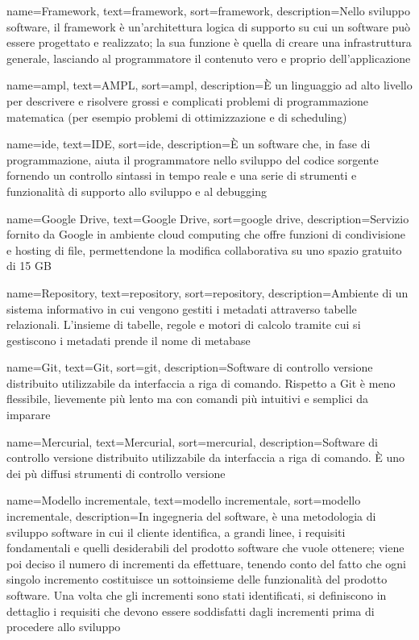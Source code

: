 {
    name=Framework,
    text=framework,
    sort=framework,
    description={Nello sviluppo software, il framework è un'architettura logica di supporto su cui un software può essere progettato e realizzato; la sua funzione è quella di creare una infrastruttura generale, lasciando al programmatore il contenuto vero e proprio dell'applicazione}
}

{
    name=\gls{ampl},
    text=AMPL,
    sort=ampl,
    description={È un linguaggio ad alto livello per descrivere e risolvere grossi e complicati problemi di programmazione matematica (per esempio problemi di ottimizzazione e di scheduling)}
}

{
    name=\gls{ide},
    text=IDE,
    sort=ide,
    description={È un software che, in fase di programmazione, aiuta il programmatore nello sviluppo del codice sorgente fornendo un controllo sintassi in tempo reale e una serie di strumenti e funzionalità di supporto allo sviluppo e al debugging}
}

{
    name=Google Drive,
    text=Google Drive,
    sort=google drive,
    description={Servizio fornito da Google in ambiente cloud computing che offre funzioni di condivisione e hosting di file, permettendone la modifica collaborativa su uno spazio gratuito di 15 GB}
}

{
    name=Repository,
    text=repository,
    sort=repository,
    description={Ambiente di un sistema informativo in cui vengono gestiti i metadati attraverso tabelle relazionali. L'insieme di tabelle, regole e motori di calcolo tramite cui si gestiscono i metadati prende il nome di metabase}
}

{
    name=Git,
    text=Git,
    sort=git,
    description={Software di controllo versione distribuito utilizzabile da interfaccia a riga di comando. Rispetto a Git è meno flessibile, lievemente più lento ma con comandi più intuitivi e semplici da imparare}
}

{
    name=Mercurial,
    text=Mercurial,
    sort=mercurial,
    description={Software di controllo versione distribuito utilizzabile da interfaccia a riga di comando. È uno dei pù diffusi strumenti di controllo versione}
}

{
    name=Modello incrementale,
    text=modello incrementale,
    sort=modello incrementale,
    description={In ingegneria del software, è una metodologia di sviluppo software in cui il cliente identifica, a grandi linee, i requisiti fondamentali e quelli desiderabili del prodotto software che vuole ottenere; viene poi deciso il numero di incrementi da effettuare, tenendo conto del fatto che ogni singolo incremento costituisce un sottoinsieme delle funzionalità del prodotto software. Una volta che gli incrementi sono stati identificati, si definiscono in dettaglio i requisiti che devono essere soddisfatti dagli incrementi prima di procedere allo sviluppo}
}


